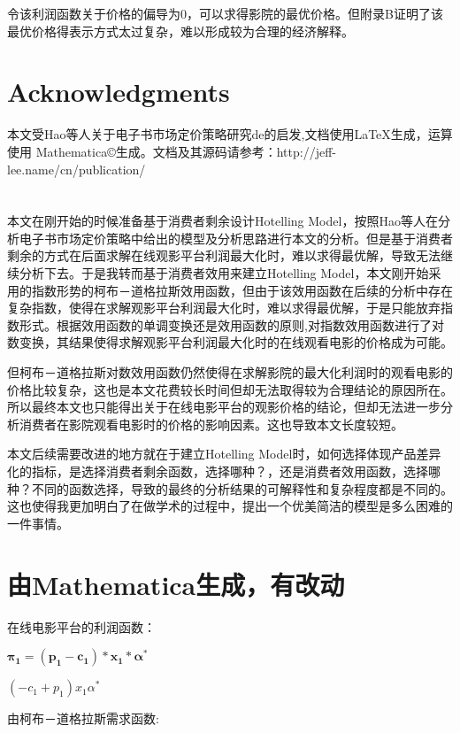 \documentclass[paper=a4, fontsize=10.5pt]{scrartcl} %
\numberwithin{equation}{section} %
\numberwithin{figure}{section} %
\numberwithin{table}{section} %
\begin{document}
\begin{CJK}{UTF8}{gbsn}
令该利润函数关于价格的偏导为0，可以求得影院的最优价格。但附录B证明了该最优价格得表示方式太过复杂，难以形成较为合理的经济解释。

\section{Acknowledgments}
本文受Hao等人关于电子书市场定价策略研究de的启发\cite{LinHao2014},文档使用\LaTeX 生成，运算使用 Mathematica\copyright 生成。文档及其源码请参考：http://jeff-lee.name/cn/publication/



\appendix
\appendixpage
\section{}
本文在刚开始的时候准备基于消费者剩余设计Hotelling Model，按照Hao等人在分析电子书市场定价策略中给出的模型及分析思路进行本文的分析。但是基于消费者剩余的方式在后面求解在线观影平台利润最大化时，难以求得最优解，导致无法继续分析下去。于是我转而基于消费者效用来建立Hotelling Model，本文刚开始采用的指数形势的柯布－道格拉斯效用函数，但由于该效用函数在后续的分析中存在复杂指数，使得在求解观影平台利润最大化时，难以求得最优解，于是只能放弃指数形式。根据效用函数的单调变换还是效用函数的原则,对指数效用函数进行了对数变换，其结果使得求解观影平台利润最大化时的在线观看电影的价格成为可能。

但柯布－道格拉斯对数效用函数仍然使得在求解影院的最大化利润时的观看电影的价格比较复杂，这也是本文花费较长时间但却无法取得较为合理结论的原因所在。所以最终本文也只能得出关于在线电影平台的观影价格的结论，但却无法进一步分析消费者在影院观看电影时的价格的影响因素。这也导致本文长度较短。

本文后续需要改进的地方就在于建立Hotelling Model时，如何选择体现产品差异化的指标，是选择消费者剩余函数，选择哪种？，还是消费者效用函数，选择哪种？不同的函数选择，导致的最终的分析结果的可解释性和复杂程度都是不同的。这也使得我更加明白了在做学术的过程中，提出一个优美简洁的模型是多么困难的一件事情。


\section{由Mathematica生成，有改动}
在线电影平台的利润函数：

\(\pmb{\pi _1= \left(p_1-c_1\right)*x_1*\alpha ^*}\)


\(\left(-c_1+p_1\right) x_1 \alpha ^*\)


由柯布－道格拉斯需求函数:


\end{CJK}
\end{document}
